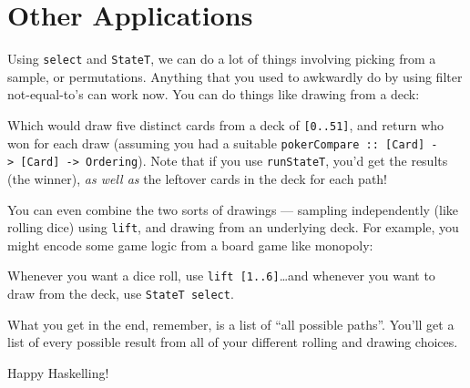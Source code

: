 \documentclass[]{article}
\newenvironment{Shaded}{}{}
\newcommand{\KeywordTok}[1]{\textcolor[rgb]{0.00,0.44,0.13}{\textbf{{#1}}}}
\newcommand{\DataTypeTok}[1]{\textcolor[rgb]{0.56,0.13,0.00}{{#1}}}
\newcommand{\DecValTok}[1]{\textcolor[rgb]{0.25,0.63,0.44}{{#1}}}
\newcommand{\OtherTok}[1]{\textcolor[rgb]{0.00,0.44,0.13}{{#1}}}
\newcommand{\FunctionTok}[1]{\textcolor[rgb]{0.02,0.16,0.49}{{#1}}}
\newcommand{\NormalTok}[1]{{#1}}
\begin{document}
\section{Other Applications}\label{other-applications}

Using \texttt{select} and \texttt{StateT}, we can do a lot of things
involving picking from a sample, or permutations. Anything that you used
to awkwardly do by using filter not-equal-to's can work now. You can do
things like drawing from a deck:

\begin{Shaded}
\end{Shaded}

Which would draw five distinct cards from a deck of
\texttt{{[}0..51{]}}, and return who won for each draw (assuming you had
a suitable
\texttt{pokerCompare\ ::\ {[}Card{]}\ -\textgreater{}\ {[}Card{]}\ -\textgreater{}\ Ordering}).
Note that if you use \texttt{runStateT}, you'd get the results (the
winner), \emph{as well as} the leftover cards in the deck for each path!

You can even combine the two sorts of drawings --- sampling
independently (like rolling dice) using \texttt{lift}, and drawing from
an underlying deck. For example, you might encode some game logic from a
board game like monopoly:

\begin{Shaded}
\end{Shaded}

Whenever you want a dice roll, use \texttt{lift\ {[}1..6{]}}\ldots{}and
whenever you want to draw from the deck, use \texttt{StateT\ select}.

What you get in the end, remember, is a list of ``all possible paths''.
You'll get a list of every possible result from all of your different
rolling and drawing choices.

Happy Haskelling!
\end{document}
